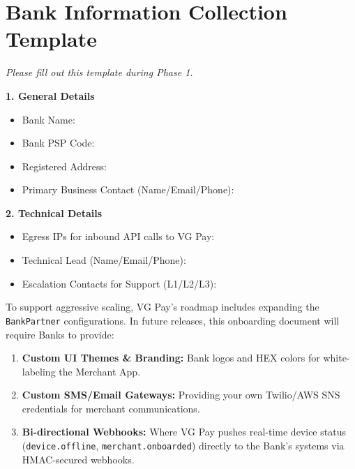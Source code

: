 \documentclass[11pt,a4paper]{article}
\begin{document}
\section{Bank Information Collection Template}

\textit{Please fill out this template during Phase 1.}

\textbf{1. General Details}
\begin{itemize}
    \item Bank Name:
    \item Bank PSP Code:
    \item Registered Address:
    \item Primary Business Contact (Name/Email/Phone):
\end{itemize}

\textbf{2. Technical Details}
\begin{itemize}
    \item Egress IPs for inbound API calls to VG Pay:
    \item Technical Lead (Name/Email/Phone):
    \item Escalation Contacts for Support (L1/L2/L3):
\end{itemize}

\vspace{1cm}
\begin{tcolorbox}[colback=blue!5!white,colframe=blue!75!black,title=NOTE: Future Scope Considerations]
To support aggressive scaling, VG Pay's roadmap includes expanding the \texttt{BankPartner} configurations. In future releases, this onboarding document will require Banks to provide:
\begin{enumerate}
    \item \textbf{Custom UI Themes \& Branding:} Bank logos and HEX colors for white-labeling the Merchant App.
    \item \textbf{Custom SMS/Email Gateways:} Providing your own Twilio/AWS SNS credentials for merchant communications.
    \item \textbf{Bi-directional Webhooks:} Where VG Pay pushes real-time device status (\texttt{device.offline}, \texttt{merchant.onboarded}) directly to the Bank's systems via HMAC-secured webhooks.
\end{enumerate}
\end{tcolorbox}
\end{document}
